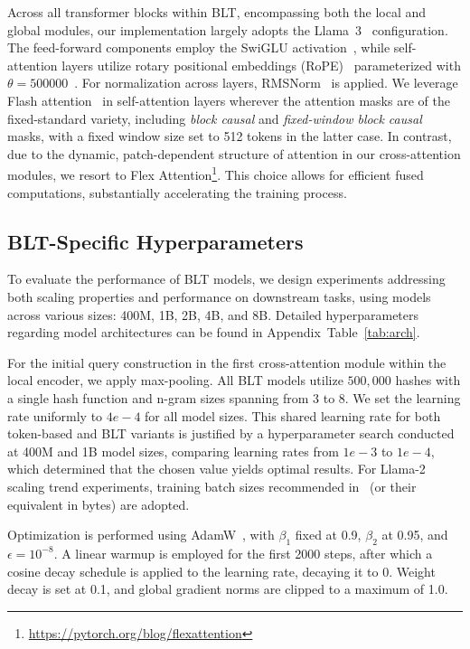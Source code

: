 Across all transformer blocks within {\textsc BLT}, encompassing both the local and global modules, our implementation largely adopts the Llama~3~\citep{dubey2024llama} configuration. The feed-forward components employ the SwiGLU activation~\citep{swiglu}, while self-attention layers utilize rotary positional embeddings (RoPE)~\citep{RoPe} parameterized with $\theta=500000$~\citep{xiong2024effective}. For normalization across layers, RMSNorm~\citep{RMSNorm} is applied. We leverage Flash attention~\citep{dao2022flashattention} in self-attention layers wherever the attention masks are of the fixed-standard variety, including \textit{block causal} and \textit{fixed-window block causal} masks, with a fixed window size set to 512 tokens in the latter case. In contrast, due to the dynamic, patch-dependent structure of attention in our cross-attention modules, we resort to Flex Attention\footnote{\url{https://pytorch.org/blog/flexattention}}. This choice allows for efficient fused computations, substantially accelerating the training process.

\subsection{{\textsc BLT}-Specific Hyperparameters} 

To evaluate the performance of {\textsc BLT} models, we design experiments addressing both scaling properties and performance on downstream tasks, using models across various sizes: 400M, 1B, 2B, 4B, and 8B. Detailed hyperparameters regarding model architectures can be found in Appendix~Table~\ref{tab:arch}.

For the initial query construction in the first cross-attention module within the local encoder, we apply max-pooling. All {\textsc BLT} models utilize $500,000$ hashes with a single hash function and n-gram sizes spanning from 3 to 8. We set the learning rate uniformly to $4e-4$ for all model sizes. This shared learning rate for both token-based and {\textsc BLT} variants is justified by a hyperparameter search conducted at 400M and 1B model sizes, comparing learning rates from $1e-3$ to $1e-4$, which determined that the chosen value yields optimal results. For Llama-2 scaling trend experiments, training batch sizes recommended in~\cite{dubey2024llama} (or their equivalent in bytes) are adopted.

Optimization is performed using AdamW~\citep{adamw}, with $\beta_1$ fixed at 0.9, $\beta_2$ at 0.95, and $\epsilon=10^{-8}$. A linear warmup is employed for the first 2000 steps, after which a cosine decay schedule is applied to the learning rate, decaying it to 0. Weight decay is set at 0.1, and global gradient norms are clipped to a maximum of 1.0.

